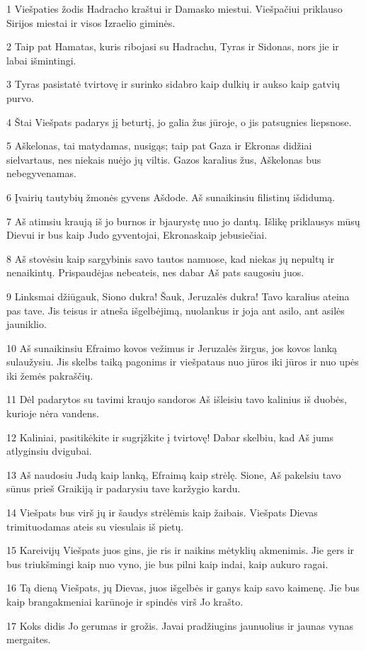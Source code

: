 \par 1 Viešpaties žodis Hadracho kraštui ir Damasko miestui. Viešpačiui priklauso Sirijos miestai ir visos Izraelio giminės. 
\par 2 Taip pat Hamatas, kuris ribojasi su Hadrachu, Tyras ir Sidonas, nors jie ir labai išmintingi. 
\par 3 Tyras pasistatė tvirtovę ir surinko sidabro kaip dulkių ir aukso kaip gatvių purvo. 
\par 4 Štai Viešpats padarys jį beturtį, jo galia žus jūroje, o jis pats­ugnies liepsnose. 
\par 5 Aškelonas, tai matydamas, nusigąs; taip pat Gaza ir Ekronas didžiai sielvartaus, nes niekais nuėjo jų viltis. Gazos karalius žus, Aškelonas bus nebegyvenamas. 
\par 6 Įvairių tautybių žmonės gyvens Ašdode. Aš sunaikinsiu filistinų išdidumą. 
\par 7 Aš atimsiu kraują iš jo burnos ir bjaurystę nuo jo dantų. Išlikę priklausys mūsų Dievui ir bus kaip Judo gyventojai, Ekronas­kaip jebusiečiai. 
\par 8 Aš stovėsiu kaip sargybinis savo tautos namuose, kad niekas jų nepultų ir nenaikintų. Prispaudėjas nebeateis, nes dabar Aš pats saugosiu juos. 
\par 9 Linksmai džiūgauk, Siono dukra! Šauk, Jeruzalės dukra! Tavo karalius ateina pas tave. Jis teisus ir atneša išgelbėjimą, nuolankus ir joja ant asilo, ant asilės jauniklio. 
\par 10 Aš sunaikinsiu Efraimo kovos vežimus ir Jeruzalės žirgus, jos kovos lanką sulaužysiu. Jis skelbs taiką pagonims ir viešpataus nuo jūros iki jūros ir nuo upės iki žemės pakraščių. 
\par 11 Dėl padarytos su tavimi kraujo sandoros Aš išleisiu tavo kalinius iš duobės, kurioje nėra vandens. 
\par 12 Kaliniai, pasitikėkite ir sugrįžkite į tvirtovę! Dabar skelbiu, kad Aš jums atlyginsiu dvigubai. 
\par 13 Aš naudosiu Judą kaip lanką, Efraimą kaip strėlę. Sione, Aš pakelsiu tavo sūnus prieš Graikiją ir padarysiu tave karžygio kardu. 
\par 14 Viešpats bus virš jų ir šaudys strėlėmis kaip žaibais. Viešpats Dievas trimituodamas ateis su viesulais iš pietų. 
\par 15 Kareivijų Viešpats juos gins, jie ris ir naikins mėtyklių akmenimis. Jie gers ir bus triukšmingi kaip nuo vyno, jie bus pilni kaip indai, kaip aukuro ragai. 
\par 16 Tą dieną Viešpats, jų Dievas, juos išgelbės ir ganys kaip savo kaimenę. Jie bus kaip brangakmeniai karūnoje ir spindės virš Jo krašto. 
\par 17 Koks didis Jo gerumas ir grožis. Javai pradžiugins jaunuolius ir jaunas vynas mergaites.



